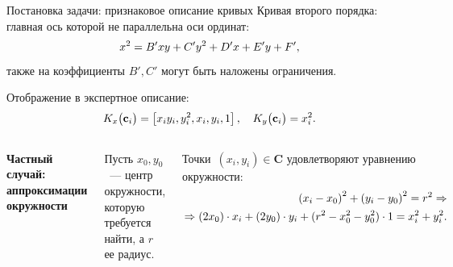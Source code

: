 \documentclass[10pt,pdf,hyperref={unicode}]{beamer}
\begin{document}

\begin{frame}{Постановка задачи: признаковое описание кривых}
\justifying
Кривая второго порядка: главная ось которой не параллельна оси ординат:
\[
\setlength\abovedisplayskip{0pt}
x^2 = B'xy+C'y^2+D'x+E'y+F',
\setlength\belowdisplayskip{0pt}
\]
также на коэффициенты $B',C'$ могут быть наложены ограничения. 

Отображение в экспертное описание:
\[
\setlength\abovedisplayskip{0pt}
K_x\bigr(\mathbf{c}_i\bigr)=\left[x_iy_i, y_i^2, x_i, y_i, 1\right], \quad K_y\bigr(\mathbf{c}_i\bigr)=x_i^2.
\setlength\belowdisplayskip{0pt}
\]

\begin{columns}
\textbf{Частный случай: аппроксимации окружности}

Пусть $x_0, y_0$~--- центр окружности, которую требуется найти, а $r$ ее радиус.

Точки~$\left(x_i, y_i\right)\in\textbf{C}$ удовлетворяют уравнению окружности:
\[
\setlength\abovedisplayskip{0pt}
\begin{aligned}
\left(x_i - x_0\right)^{2}+\left(y_i-y_0\right)^2 = r^2 \Rightarrow\\
\Rightarrow(2x_0)\cdot x_i + (2y_0)\cdot y_i+(r^2-x_0^2-y_0^2)\cdot1 = x_{i}^2 + y_{i}^2.
\end{aligned}
\setlength\belowdisplayskip{0pt}
\]
\begin{center}
	\includegraphics[height=0.37\textheight]{figures/slides_statment}
\end{center}
\end{columns}


\end{frame}
\end{document}
